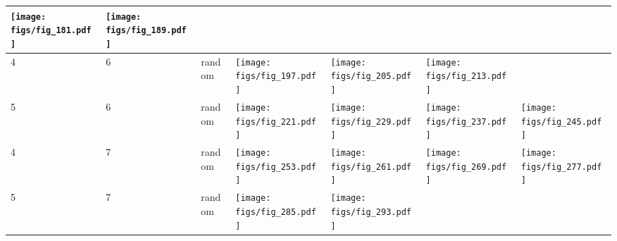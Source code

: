 \documentclass[oneside,canadian,landscape]{article}
\begin{document}
\begin{center}
\begin{longtable}{|l|l|l||l|l|l|l|}
\begin{minipage}{3.5cm}
\texttt{[image: figs/fig\_181.pdf]}
\end{minipage}
&\begin{minipage}{3.5cm}
\texttt{[image: figs/fig\_189.pdf]}
\end{minipage}
&\\ \hline
4&6&random&\begin{minipage}{3.5cm}
\texttt{[image: figs/fig\_197.pdf]}
\end{minipage}
&\begin{minipage}{3.5cm}
\texttt{[image: figs/fig\_205.pdf]}
\end{minipage}
&\begin{minipage}{3.5cm}
\texttt{[image: figs/fig\_213.pdf]}
\end{minipage}
&\\ \hline
5&6&random&\begin{minipage}{3.5cm}
\texttt{[image: figs/fig\_221.pdf]}
\end{minipage}
&\begin{minipage}{3.5cm}
\texttt{[image: figs/fig\_229.pdf]}
\end{minipage}
&\begin{minipage}{3.5cm}
\texttt{[image: figs/fig\_237.pdf]}
\end{minipage}
&\begin{minipage}{3.5cm}
\texttt{[image: figs/fig\_245.pdf]}
\end{minipage}
\\ \hline
4&7&random&\begin{minipage}{3.5cm}
\texttt{[image: figs/fig\_253.pdf]}
\end{minipage}
&\begin{minipage}{3.5cm}
\texttt{[image: figs/fig\_261.pdf]}
\end{minipage}
&\begin{minipage}{3.5cm}
\texttt{[image: figs/fig\_269.pdf]}
\end{minipage}
&\begin{minipage}{3.5cm}
\texttt{[image: figs/fig\_277.pdf]}
\end{minipage}
\\ \hline
5&7&random&\begin{minipage}{3.5cm}
\texttt{[image: figs/fig\_285.pdf]}
\end{minipage}
&\begin{minipage}{3.5cm}
\texttt{[image: figs/fig\_293.pdf]}

\end{minipage}
\end{longtable}
\end{center}
\end{document}
